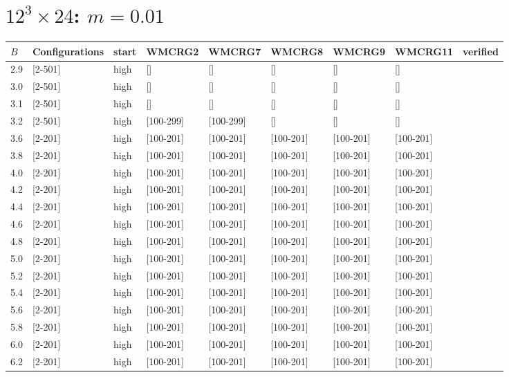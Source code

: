 \documentclass[11pt]{article}
\begin{document}
  \section{$12^3\times24$:  $m=0.01$}
    \begin{tabular}{| l | l | l | l | l | l | l | l | l |}
      \hline
      $B$ & Configurations & start & WMCRG2 & WMCRG7 & WMCRG8 & WMCRG9 & WMCRG11 & verified\\
      \hline
      2.9 & [2-501] & high & [] & [] & [] & [] & [] &\\
      3.0 & [2-501] & high & [] & [] & [] & [] & [] &\\
      3.1 & [2-501] & high & [] & [] & [] & [] & [] &\\
      3.2 & [2-501] & high & [100-299] & [100-299] & [] & [] & [] &\\
      3.6 & [2-201] & high & [100-201] & [100-201] & [100-201] & [100-201] & [100-201] &\\
      3.8 & [2-201] & high & [100-201] & [100-201] & [100-201] & [100-201] & [100-201] &\\
      4.0 & [2-201] & high & [100-201] & [100-201] & [100-201] & [100-201] & [100-201] &\\
      4.2 & [2-201] & high & [100-201] & [100-201] & [100-201] & [100-201] & [100-201] &\\
      4.4 & [2-201] & high & [100-201] & [100-201] & [100-201] & [100-201] & [100-201] &\\
      4.6 & [2-201] & high & [100-201] & [100-201] & [100-201] & [100-201] & [100-201] &\\
      4.8 & [2-201] & high & [100-201] & [100-201] & [100-201] & [100-201] & [100-201] &\\
      5.0 & [2-201] & high & [100-201] & [100-201] & [100-201] & [100-201] & [100-201] &\\
      5.2 & [2-201] & high & [100-201] & [100-201] & [100-201] & [100-201] & [100-201] &\\
      5.4 & [2-201] & high & [100-201] & [100-201] & [100-201] & [100-201] & [100-201] &\\
      5.6 & [2-201] & high & [100-201] & [100-201] & [100-201] & [100-201] & [100-201] &\\
      5.8 & [2-201] & high & [100-201] & [100-201] & [100-201] & [100-201] & [100-201] &\\
      6.0 & [2-201] & high & [100-201] & [100-201] & [100-201] & [100-201] & [100-201] &\\
      6.2 & [2-201] & high & [100-201] & [100-201] & [100-201] & [100-201] & [100-201] &\\

\end{tabular}
\end{document}
